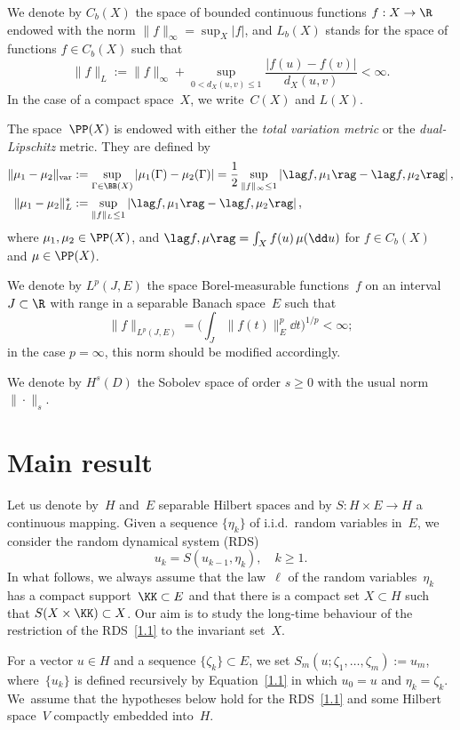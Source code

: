 We denote by $C_b(X)$ the space of bounded continuous functions $f:X\to\R$ endowed with the norm $\|f\|_\infty=\sup_X|f|$, and $L_b(X)$ stands for the space of functions $f\in C_b(X)$ such that
\[
\|f\|_L:=\|f\|_\infty+\sup_{0<d_X(u,v)\le 1}\frac{|f(u)-f(v)|}{d_X(u,v)}<\infty.
\]
In the case of a compact space~$X$, we write~$C(X)$ and $L(X)$.

The space~$\PP(X)$ is endowed with either the \emph{total variation metric} or the \emph{dual-Lipschitz} metric. They are defined by
\begin{align}
\|\mu_1-\mu_2\|_{\mathrm{var}}&:=\sup_{\Gamma\in\BB(X)}|\mu_1(\Gamma)-\mu_2(\Gamma)|
=\frac12\sup_{\|f\|_\infty\le1}
\left|\lag f,\mu_1\rag-\lag f,\mu_2\rag\right|, \label{TVN}\\
\|\mu_1-\mu_2\|_L^*
&:=\sup_{\|f\|_L\le1}\left|\lag f,\mu_1\rag-\lag f,\mu_2\rag\right|, \label{dL}
\end{align}
where $\mu_1, \mu_2\in \PP(X)$, and $\lag f,\mu\rag = \int_X f(u) \,\mu(\dd u)$ for $f\in C_b(X)$ and $\mu\in \PP(X)$.

We denote by $L^p(J,E)$ the space Borel-measurable functions~$f$ on an interval $J\subset\R$ with range in a separable Banach space~$E$ such that
\[
\|f\|_{L^p(J,E)}=\biggl(\int_J \|f(t)\|_E^p\dd t\biggr)^{1/p}<\infty;
\]
in the case $p=\infty$, this norm should be modified accordingly.

We denote by $H^s(D)$ the Sobolev space of order $s\ge0$ with the usual norm~$\|\cdot\|_s$.

\section{Main result}
\label{s1}

Let us denote by~$H$ and~$E$ separable Hilbert spaces and by $S:H\times E\to H$ a continuous mapping. Given a sequence $\{\eta_k\}$ of i.i.d.\ random variables in~$E$, we consider the random dynamical system (RDS)
\begin{equation} \label{1.1}
u_k=S(u_{k-1},\eta_k), \quad k\ge1.
\end{equation}
In what follows, we always assume that the law~$\ell$ of the random variables~$\eta_k$ has a compact support~$\KK\subset E$ and that there is a compact set $X\subset H$ such that $S(X\times\KK)\subset X$. Our aim is to study the long-time behaviour of the restriction of the RDS~\eqref{1.1} to the invariant set~$X$.

For a vector $u\in H$ and a sequence $\{\zeta_k\}\subset E$, we set $S_m(u;\zeta_1,\dots,\zeta_m):=u_m$, where~$\{u_k\}$ is defined recursively by Equation~\eqref{1.1} in which $u_0=u$ and $\eta_k=\zeta_k$. We~assume that the hypotheses below hold for the RDS~\eqref{1.1} and some Hilbert space~$V$ compactly embedded into~$H$.


